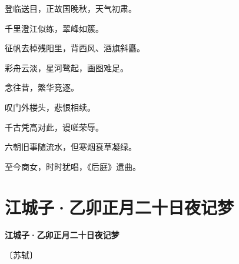 \documentclass[12pt,UTF-8,openany,fontset=none]{ctexbook}
\begin{document}
    \vspace{18pt}  %

\begin{center}
    \begin{Large}

        登临送目，正故国晚秋，天气初肃。

        千里澄江似练，翠峰如簇。

        征帆去棹残阳里，背西风、酒旗斜矗。

        彩舟云淡，星河鹭起，画图难足。

        \vspace{18pt}  %

        念往昔，繁华竞逐。

        叹门外楼头，悲恨相续。

        千古凭高对此，谩嗟荣辱。

        六朝旧事随流水，但寒烟衰草凝绿。

        至今商女，时时犹唱，《后庭》遗曲。

    \end{Large}

\end{center}

\vspace{8pt}
\clearpage

\section{江城子·乙卯正月二十日夜记梦}


\begin{center}
    {\bfseries 江城子·乙卯正月二十日夜记梦}

    \vspace{18pt}

    \begin{large}\xuwen
        〔苏轼〕
    \end{large}

\end{center}

    \vspace{18pt}  %
\end{document}
